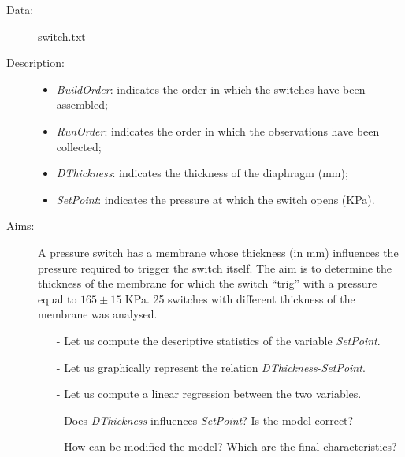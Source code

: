 

\begin{frame}
  \begin{description}
    \item[Data: ]switch.txt \\ 
    \item[Description: ]
      \begin{footnotesize}
        \begin{itemize}
	  \item \textit{BuildOrder}: indicates the order in which the switches have been assembled;
          \item \textit{RunOrder}: indicates the order in which the observations have been collected;
          \item \textit{DThickness}: indicates the thickness of the diaphragm (mm);
          \item \textit{SetPoint}: indicates the pressure at which the switch opens (KPa).
        \end{itemize}
      \end{footnotesize}
    \item[Aims: ]
      \begin{footnotesize}
        A pressure switch has a membrane whose thickness (in mm) influences the pressure required to trigger the switch itself. The aim is to determine the thickness of the membrane for which the switch ``trig'' with a pressure equal to $165 \pm 15$ KPa. 25 switches with different thickness of the membrane was analysed. 
        \begin{itemize}
          \item[-] Let us compute the descriptive statistics of the variable \textit{SetPoint}.
          \item[-] Let us graphically represent the relation \textit{DThickness}-\textit{SetPoint}.
          \item[-] Let us compute a linear regression between the two variables.
          \item[-] Does \textit{DThickness} influences \textit{SetPoint}? Is the model correct?
          \item[-] How can be modified the model? Which are the final characteristics?
        \end{itemize}
      \end{footnotesize}
  \end{description}
\end{frame}

